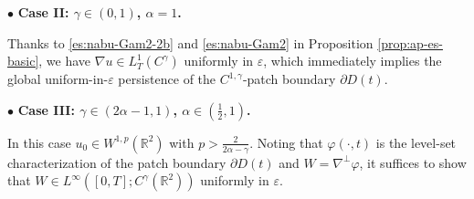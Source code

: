 \documentclass[reqno,11pt,a4paper]{amsart}
\newcommand{\R}{\ensuremath{\mathbb{R}}}
\begin{document}
$\bullet$ \textbf{Case II: $\gamma\in(0,1)$, $\alpha=1$.}
\vskip1mm

Thanks to \eqref{es:nabu-Gam2-2b} and \eqref{es:nabu-Gam2} in Proposition \ref{prop:ap-es-basic}, 
we have $\nabla u\in L_T^1(C^\gamma)$ uniformly in $\varepsilon$, 
which immediately implies the global uniform-in-$\varepsilon$ persistence of the 
$C^{1,\gamma}$-patch boundary $\partial D(t)$.
\vskip1mm
 
$\bullet$ \textbf{Case III: $\gamma\in(2\alpha-1,1)$, $\alpha\in(\frac{1}{2},1)$.} 
\vskip1mm

In this case $u_0\in W^{1,p}(\mathbb{R}^2)$ with $p>\frac{2}{2\alpha-\gamma}$. 
Noting that $\varphi(\cdot,t)$ is the level-set characterization of the patch boundary 
$\partial D(t)$ and $W=\nabla^\perp \varphi$, 
it suffices to show that $W \in L^\infty([0,T]; C^\gamma(\R^2))$ uniformly in $\varepsilon$. 
\end{document}
